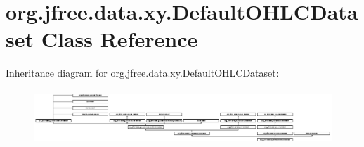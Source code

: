 \hypertarget{classorg_1_1jfree_1_1data_1_1xy_1_1_default_o_h_l_c_dataset}{}\section{org.\+jfree.\+data.\+xy.\+Default\+O\+H\+L\+C\+Dataset Class Reference}
\label{classorg_1_1jfree_1_1data_1_1xy_1_1_default_o_h_l_c_dataset}
Inheritance diagram for org.\+jfree.\+data.\+xy.\+Default\+O\+H\+L\+C\+Dataset\+:\begin{figure}[H]
\begin{center}
\leavevmode
\includegraphics[height=2.051282cm]{classorg_1_1jfree_1_1data_1_1xy_1_1_default_o_h_l_c_dataset}
\end{center}
\end{figure}
